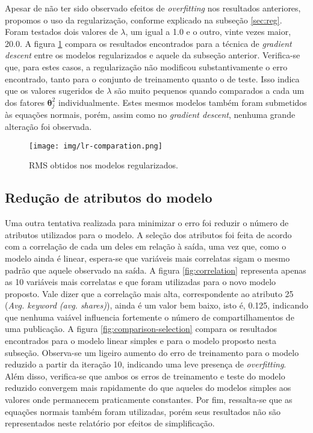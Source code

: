 \documentclass[10pt,twocolumn,letterpaper]{article}
\begin{document}
Apesar de não ter sido observado efeitos de \textit{overfitting} nos resultados anteriores, propomos o uso da regularização, conforme explicado na subseção \ref{sec:reg}. Foram testados dois valores de \(\lambda\), um igual a 1.0 e o outro, vinte vezes maior, 20.0. A figura \ref{fig:reg-comparison} compara os resultados encontrados para a técnica de \textit{gradient descent} entre os modelos regularizados e aquele da subseção anterior. Verifica-se que, para estes casos, a regularização não modificou substantivamente o erro encontrado, tanto para o conjunto de treinamento quanto o de teste. Isso indica que os valores sugeridos de \(\lambda\) são muito pequenos quando comparados a cada um dos fatores \(\bm{\theta}_j^2\) individualmente.  Estes mesmos modelos também foram submetidos às equações normais, porém, assim como no \textit{gradient descent}, nenhuma grande alteração foi observada.

\begin{figure}
    \centering
    \texttt{[image: img/lr-comparation.png]}
    \caption{RMS obtidos nos modelos regularizados.}
    \label{fig:reg-comparison}
\end{figure}

\subsection{Redução de atributos do modelo}

Uma outra tentativa realizada para minimizar o erro foi reduzir o número de atributos utilizados para o modelo. A seleção dos atributos foi feita de acordo com a correlação de cada um deles em relação à saída, uma vez que, como o modelo ainda é linear, espera-se que variáveis mais correlatas sigam o mesmo padrão que aquele observado na saída. A figura \ref {fig:correlation} representa apenas as 10 variáveis mais correlatas e que foram utilizadas para o novo modelo proposto. Vale dizer que a correlação mais alta, correspondente ao atributo 25 (\textit{Avg. keyword (avg. shares)}), ainda é um valor bem baixo, isto é, 0.125, indicando que nenhuma vaiável influencia fortemente o número de compartilhamentos de uma publicação. A figura \ref{fig:comparison-selection} compara os resultados encontrados para o modelo linear simples e para o modelo proposto nesta subseção. Observa-se um ligeiro aumento do erro de treinamento para o modelo reduzido a partir da iteração 10, indicando uma leve presença de \textit {overfitting}. Além disso, verifica-se que ambos os erros de treinamento e teste do modelo reduzido convergem mais rapidamente do que aqueles do modelos simples aos valores onde permanecem praticamente constantes. Por fim, ressalta-se que as equações normais também foram utilizadas, porém seus resultados não são representados neste relatório por efeitos de simplificação.
\end{document}
